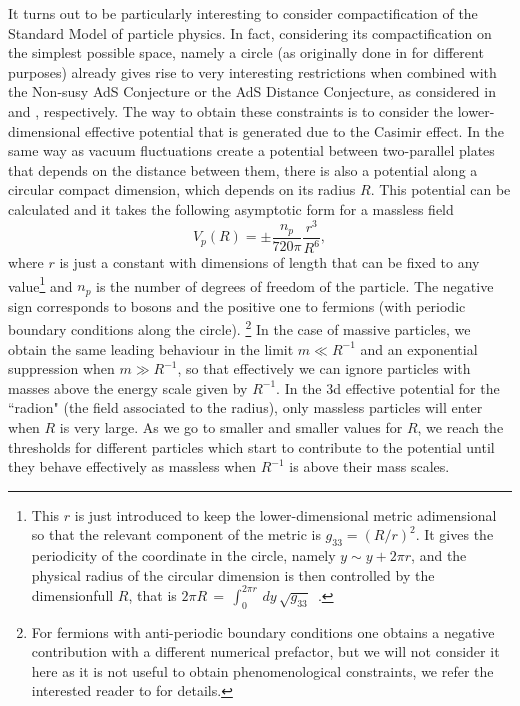 \documentclass[11pt,a4paper]{article}
\begin{document}
It turns out to be particularly interesting to consider compactification of the Standard Model of particle physics. In fact, considering its compactification on the simplest possible space, namely a circle  (as originally done in \cite{ArkaniHamed:2007gg} for different purposes) already gives rise to very interesting restrictions when combined with the Non-susy AdS Conjecture  or the AdS Distance Conjecture, as considered in \cite{Ibanez:2017kvh,Ibanez:2017oqr,Hamada:2017yji,Gonzalo:2018tpb,Gonzalo:2018dxi} and \cite{Rudelius:2021oaz, Gonzalo:2021fma, Gonzalo:Toappear}, respectively. The way to obtain these constraints is to consider the lower-dimensional effective potential that is generated due to the Casimir effect. In the same way as vacuum fluctuations create a potential between two-parallel plates that depends on the distance between them, there is also a potential along a circular compact dimension, which depends on its radius $R$. This potential can be calculated and it takes the following asymptotic form for a massless field
\begin{equation}
\label{eq:casimirpotential}
V_{p}(R)=\pm \dfrac{n_{p}}{720 \pi} \frac{r^3}{R^{6}},
\end{equation}
where $r$ is just a constant with dimensions of length that can be fixed to any value\footnote{This $r$ is just introduced to keep the lower-dimensional metric adimensional so that the relevant component of the metric is $g_{33}=(R/r)^2$. It gives the periodicity of the coordinate in the circle, namely $y \sim y + 2 \pi r$, and the physical radius of the circular dimension is then controlled by the dimensionfull $R$, that is $2 \pi R \, = \,\int_{0}^{2\pi r} \, dy\,  \sqrt{g_{33}}\, $ .} and $n_p$ is the number of degrees of freedom of the particle. The negative sign corresponds to bosons and the positive one to fermions (with periodic boundary conditions along the circle). \footnote{For fermions with anti-periodic boundary conditions one obtains a negative contribution with a different numerical prefactor, but we will not consider it here as it is not useful to obtain phenomenological constraints, we refer the interested reader to \cite{Hamada:2017yji,Gonzalo:2018tpb} for details.} In the case of massive particles, we obtain the same leading behaviour in the limit $m\ll R^{-1}$ and an exponential suppression when $m\gg R^{-1}$, so that effectively we can ignore particles with masses above the energy scale given by $R^{-1}$. In the 3d effective potential for the ``radion" (the field associated to the radius), only massless particles will enter when $R$ is very large. As we go to smaller and smaller values for $R$, we reach the  thresholds for different particles which start to contribute to the potential until they behave effectively as massless when $R^{-1}$ is above their mass scales.
\end{document}
